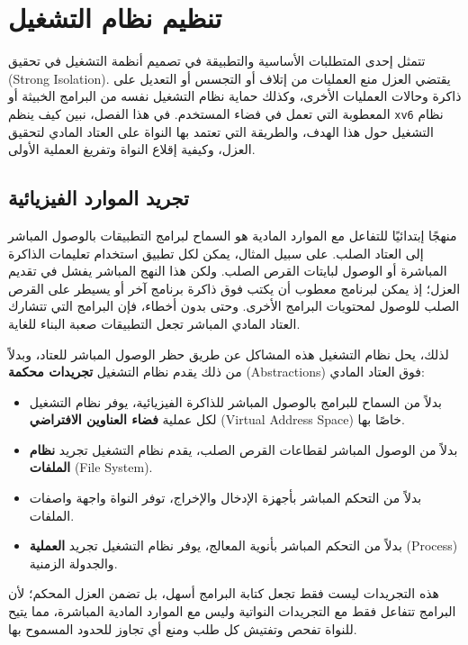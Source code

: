 \chapter{تنظيم نظام التشغيل}
\label{CH:FIRST}

تتمثل إحدى المتطلبات الأساسية والتطبيقة في تصميم أنظمة التشغيل في تحقيق
 (Strong Isolation).
يقتضي العزل منع العمليات من إتلاف أو التجسس أو التعديل على ذاكرة وحالات العمليات الأخرى،
وكذلك حماية نظام التشغيل نفسه من البرامج الخبيثة أو المعطوبة التي تعمل في فضاء المستخدم.
في هذا الفصل، نبين كيف ينظم \texttt{xv6} نظام التشغيل حول هذا الهدف،
والطريقة التي تعتمد بها النواة على العتاد المادي لتحقيق العزل، وكيفية إقلاع النواة وتفريغ العملية الأولى.

\section{تجريد الموارد الفيزيائية}
\label{sec:abstracting_resources}

منهجًا إبتدائيًا للتفاعل مع الموارد المادية هو السماح لبرامج التطبيقات بالوصول المباشر إلى العتاد الصلب.
على سبيل المثال، يمكن لكل تطبيق استخدام تعليمات الذاكرة المباشرة أو الوصول لبايتات القرص الصلب.
ولكن هذا النهج المباشر يفشل في تقديم العزل؛
إذ يمكن لبرنامج معطوب أن يكتب فوق ذاكرة برنامج آخر أو يسيطر على القرص الصلب للوصول لمحتويات البرامج الأخرى.
وحتى بدون أخطاء، فإن البرامج التي تتشارك العتاد المادي المباشر تجعل التطبيقات صعبة البناء للغاية.

لذلك، يحل نظام التشغيل هذه المشاكل عن طريق حظر الوصول المباشر للعتاد،
وبدلاً من ذلك يقدم نظام التشغيل \textbf{تجريدات محكمة} (Abstractions) فوق العتاد المادي:
\begin{itemize}
  \item بدلاً من السماح للبرامج بالوصول المباشر للذاكرة الفيزيائية، يوفر نظام التشغيل لكل عملية \textbf{فضاء العناوين الافتراضي} (Virtual Address Space) خاصًا بها.
  \item بدلاً من الوصول المباشر لقطاعات القرص الصلب، يقدم نظام التشغيل تجريد \textbf{نظام الملفات} (File System).
  \item بدلاً من التحكم المباشر بأجهزة الإدخال والإخراج، توفر النواة واجهة واصفات الملفات.
  \item بدلاً من التحكم المباشر بأنوية المعالج، يوفر نظام التشغيل تجريد \textbf{العملية} (Process) والجدولة الزمنية.
\end{itemize}

هذه التجريدات ليست فقط تجعل كتابة البرامج أسهل، بل تضمن العزل المحكم؛
لأن البرامج تتفاعل فقط مع التجريدات النواتية وليس مع الموارد المادية المباشرة،
مما يتيح للنواة تفحص وتفتيش كل طلب ومنع أي تجاوز للحدود المسموح بها.

